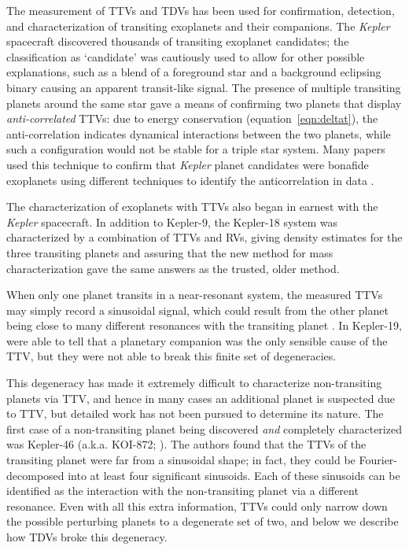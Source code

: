 \documentclass[graybox,natbib,nosecnum]{svmult}
\begin{document}
The measurement of TTVs and TDVs has been used for confirmation, detection, and characterization of
transiting exoplanets and their companions.  The \emph{Kepler} spacecraft discovered thousands of transiting
exoplanet candidates;  the classification as `candidate' was cautiously used to allow for other
possible explanations, such as a blend of a foreground star and a background eclipsing binary causing
an apparent transit-like signal.  The presence of multiple transiting planets around the same star
gave a means of confirming two planets that display {\em anti-correlated} TTVs: due to energy conservation (equation~\ref{eqn:deltat}), the anti-correlation indicates dynamical interactions between the
two planets, while such a configuration would not be stable for a triple star system.  Many papers
used this technique to confirm that \emph{Kepler} planet candidates were bonafide exoplanets using different techniques to identify the anticorrelation in data \citep{2012ApJ...750..113F,2012ApJ...756..185F,2012ApJ...750..114F,2012MNRAS.421.2342S,2013ApJS..208...22X}.

The characterization of exoplanets with TTVs also began in earnest with the \emph{Kepler} spacecraft.
In addition to Kepler-9, the Kepler-18 system was characterized by a combination of TTVs and
RVs, giving density estimates for the three transiting planets \citep{2011ApJS..197....7C} and assuring that the new method for mass characterization gave the same answers as the trusted, older method.

When only one planet transits in a near-resonant system, the measured TTVs may simply record a sinusoidal signal, which could result from the other planet being close to many different resonances with the transiting planet \citep{2010ApJ...718..543M}.  In Kepler-19, \cite{2011ApJ...743..200B} were able to tell that a planetary companion was the only sensible cause of the TTV, but they were not able to break this finite set of degeneracies. 

This degeneracy has made it extremely difficult to characterize non-transiting planets via TTV, and hence in many cases an additional planet is suspected due to TTV, but detailed work has not been pursued to determine its nature.  The first case of a non-transiting planet being discovered \emph{and} completely characterized was Kepler-46 (a.k.a. KOI-872; \citealt{2012Sci...336.1133N}).  The authors found that the TTVs of the transiting planet were far from a sinusoidal shape; in fact, they could be Fourier-decomposed into at least four significant sinusoids.  Each of these sinusoids can be identified as the interaction with the non-transiting planet via a different resonance.  Even with all this extra information, TTVs could only narrow down the possible perturbing planets to a degenerate set of two, and below we describe how TDVs broke this degeneracy.  
\end{document}
